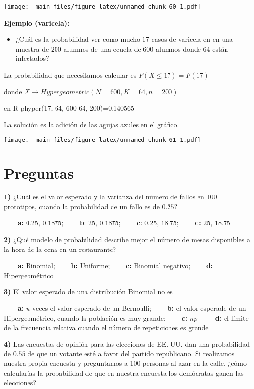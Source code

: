 \documentclass[
]{book}
\providecommand{\tightlist}{%
  \setlength{\itemsep}{0pt}\setlength{\parskip}{0pt}}
\begin{document}
\texttt{[image: \_main\_files/figure-latex/unnamed-chunk-60-1.pdf]}

\textbf{Ejemplo (varicela):}

\begin{itemize}
\tightlist
\item
  ¿Cuál es la probabilidad ver como mucho \(17\) casos de varicela en en una muestra de \(200\) alumnos de una ecuela de \(600\) alumnos donde \(64\) están infectados?
\end{itemize}

La probabilidad que necesitamos calcular es
\(P(X \leq 17)=F(17)\)

donde \(X \rightarrow Hypergeometric(N=600,K=64,n=200)\)

en R phyper(17, 64, 600-64, 200)=0.140565

La solución es la adición de las agujas azules en el gráfico.

\texttt{[image: \_main\_files/figure-latex/unnamed-chunk-61-1.pdf]}

\hypertarget{preguntas-4}{%
\section{Preguntas}\label{preguntas-4}}

\textbf{1)} ¿Cuál es el valor esperado y la varianza del número de fallos en \(100\) prototipos, cuando la probabilidad de un fallo es de \(0.25\)?

\textbf{\(\qquad\)a:} \(0.25\), \(0.1875\);
\textbf{\(\qquad\)b:} \(25\), \(0.1875\);
\textbf{\(\qquad\)c:} \(0.25\), \(18.75\);
\textbf{\(\qquad\)d:} \(25\), \(18.75\)

\textbf{2)} ¿Qué modelo de probabilidad describe mejor el número de mesas disponibles a la hora de la cena en un restaurante?

\textbf{\(\qquad\)a:} Binomial;
\textbf{\(\qquad\)b:} Uniforme;
\textbf{\(\qquad\)c:} Binomial negativo;
\textbf{\(\qquad\)d:} Hipergeométrico

\textbf{3)} El valor esperado de una distribución Binomial no es

\textbf{\(\qquad\)a:} \(n\) veces el valor esperado de un Bernoulli;
\textbf{\(\qquad\)b:} el valor esperado de un Hipergeométrico, cuando la población es muy grande;
\textbf{\(\qquad\)c:} \(np\);
\textbf{\(\qquad\)d:} el límite de la frecuencia relativa cuando el número de repeticiones es grande

\textbf{4)} Las encuestas de opinión para las elecciones de EE. UU. dan una probabilidad de \(0.55\) de que un votante esté a favor del partido republicano. Si realizamos nuestra propia encuesta y preguntamos a 100 personas al azar en la calle, ¿cómo calcularías la probabilidad de que en nuestra encuesta los demócratas ganen las elecciones?
\end{document}
